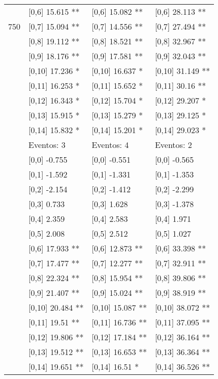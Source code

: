 \begin{table}
\begin{tabular}[t]{llll}
 & {}[0,6] 15.615 ** & {}[0,6] 15.082 ** & {}[0,6] 28.113 **\\
750 & {}[0,7] 15.094 ** & {}[0,7] 14.556 ** & {}[0,7] 27.494 **\\
\addlinespace
 & {}[0,8] 19.112 ** & {}[0,8] 18.521 ** & {}[0,8] 32.967 **\\
 & {}[0,9] 18.176 ** & {}[0,9] 17.581 ** & {}[0,9] 32.043 **\\
 & {}[0,10] 17.236 * & {}[0,10] 16.637 * & {}[0,10] 31.149 **\\
 & {}[0,11] 16.253 * & {}[0,11] 15.652 * & {}[0,11] 30.16 **\\
 & {}[0,12] 16.343 * & {}[0,12] 15.704 * & {}[0,12] 29.207 *\\
\addlinespace
 & {}[0,13] 15.915 * & {}[0,13] 15.279 * & {}[0,13] 29.125 *\\
 & {}[0,14] 15.832 * & {}[0,14] 15.201 * & {}[0,14] 29.023 *\\
 & Eventos:  3 & Eventos:  4 & Eventos:  2\\
 & {}[0,0] -0.755 & {}[0,0] -0.551 & {}[0,0] -0.565\\
 & {}[0,1] -1.592 & {}[0,1] -1.331 & {}[0,1] -1.353\\
\addlinespace
 & {}[0,2] -2.154 & {}[0,2] -1.412 & {}[0,2] -2.299\\
 & {}[0,3] 0.733 & {}[0,3] 1.628 & {}[0,3] -1.378\\
 & {}[0,4] 2.359 & {}[0,4] 2.583 & {}[0,4] 1.971\\
 & {}[0,5] 2.008 & {}[0,5] 2.512 & {}[0,5] 1.027\\
 & {}[0,6] 17.933 ** & {}[0,6] 12.873 ** & {}[0,6] 33.398 **\\
\addlinespace
1000 & {}[0,7] 17.477 ** & {}[0,7] 12.277 ** & {}[0,7] 32.911 **\\
 & {}[0,8] 22.324 ** & {}[0,8] 15.954 ** & {}[0,8] 39.806 **\\
 & {}[0,9] 21.407 ** & {}[0,9] 15.024 ** & {}[0,9] 38.919 **\\
 & {}[0,10] 20.484 ** & {}[0,10] 15.087 ** & {}[0,10] 38.072 **\\
 & {}[0,11] 19.51 ** & {}[0,11] 16.736 ** & {}[0,11] 37.095 **\\
\addlinespace
 & {}[0,12] 19.806 ** & {}[0,12] 17.184 ** & {}[0,12] 36.164 **\\
 & {}[0,13] 19.512 ** & {}[0,13] 16.653 ** & {}[0,13] 36.364 **\\
 & {}[0,14] 19.651 ** & {}[0,14] 16.51 * & {}[0,14] 36.526 **\\
\bottomrule
\end{tabular}
\end{table}
